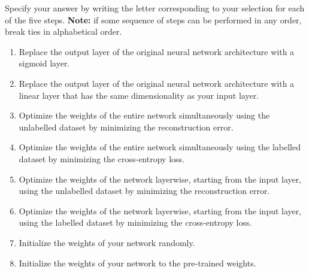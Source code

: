 \begin{parts}
Specify your answer by writing the letter corresponding to your selection for each of the five steps. \textbf{Note:} if some sequence of steps can be performed in any order, break ties in alphabetical order. 
 
\begin{enumerate}[label=\Alph*]
    \item Replace the output layer of the original neural network architecture with a sigmoid layer. 
    \item Replace the output layer of the original neural network architecture with a linear layer that has the same dimensionality as your input layer. 
    \item Optimize the weights of the entire network simultaneously using the unlabelled dataset by minimizing the reconstruction error. 
    \item Optimize the weights of the entire network simultaneously using the labelled dataset by minimizing the cross-entropy loss. 
    \item Optimize the weights of the network layerwise, starting from the input layer, using the unlabelled dataset by minimizing the reconstruction error.  
    \item Optimize the weights of the network layerwise, starting from the input layer, using the labelled dataset by minimizing the cross-entropy loss. 
    \item Initialize the weights of your network randomly.
    \item Initialize the weights of your network to the pre-trained weights. 
\end{enumerate}
\begin{comment}
\mbox{\begin{tcolorbox}[enhanced, sidebyside align=top, box align=top, height=2.5cm, width=3cm, colback=white, borderline={1pt}{-2pt} colbacktitle=black, title=Step 1]
\end{tcolorbox}\hspace{1em}\begin{tcolorbox}[enhanced, sidebyside align=top, box align=top, height=2.5cm, width=3cm, colback=white, borderline={1pt}{-2pt} colbacktitle=black, title=Step 2]
\end{tcolorbox}\hspace{1em}\begin{tcolorbox}[enhanced, sidebyside align=top, box align=top, height=2.5cm, width=3cm, colback=white, borderline={1pt}{-2pt} colbacktitle=black, title=Step 3]

\end{comment}
\end{parts}
